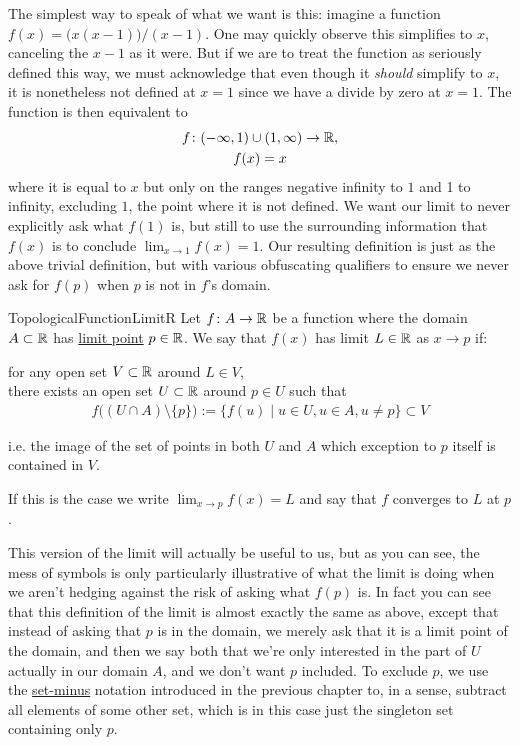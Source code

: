 \documentclass[11pt]{article}
\begin{document}
The simplest way to speak of what we want is this: imagine a function $f(x) = \big(x(x-1)\big)/(x-1)$. One may quickly observe this simplifies to $x$, canceling the $x-1$ as it were. But if we are to treat the function as seriously defined this way, we must acknowledge that even though it \emph{should} simplify to $x$, it is nonetheless not defined at $x=1$ since we have a divide by zero at $x=1$. The function is then equivalent to \begin{gather*}
f\colon (-\infty,1) \cup (1,\infty) \to \mathbb{R}, \\
f(x) = x
\end{gather*}
where it is equal to $x$ but only on the ranges negative infinity to $1$ and 1 to infinity, excluding $1$, the point where it is not defined. We want our limit to never explicitly ask what $f(1)$ is, but still to use the surrounding information that $f(x)$ is  to conclude $\lim_{x \to 1} f(x) = 1$. Our resulting definition is just as the above trivial definition, but with various obfuscating qualifiers to ensure we never ask for $f(p)$ when $p$ is not in $f$'s domain.

\begin{label definition}{TopologicalFunctionLimitR}
Let $f \colon A \to \mathbb{R}$ be a function where the domain $A \subset \mathbb{R}$ has \hyperref[pro:ClosedSetsClosedUnderLimitsR]{limit point} $p \in \mathbb{R}$. We say that $f(x)$ has limit $L \in \mathbb{R}$ as $x \to p$ if:
\begin{center}
for any open set $V \subset \mathbb{R}$ around $L \in V$,\\
there exists an open set $U \subset \mathbb{R}$ around $p \in U$ such that \begin{gather*}
f\big((U \cap A) \setminus \{p\} \big) := \{ f(u) \mid u\in U, u\in A, u \neq p\} \subset V
\end{gather*}
\end{center}
i.e. the image of the set of points in both $U$ and $A$ which exception to $p$ itself is contained in $V$.

If this is the case we write $\lim_{x\to p} f(x) = L$ and say that $f$ converges to $L$ at $p$.
\end{label definition}

This version of the limit will actually be useful to us, but as you can see, the mess of symbols is only particularly illustrative of what the limit is doing when we aren't hedging against the risk of asking what $f(p)$ is. In fact you can see that this definition of the limit is almost exactly the same as above, except that instead of asking that $p$ is in the domain, we merely ask that it is a limit point of the domain, and then we say both that we're only interested in the part of $U$ actually in our domain $A$, and we don't want $p$ included. To exclude $p$, we use the \hyperlink{https://clockssugars.blog/appliuni/prelims/maththink.html\#maththink_4}{set-minus} notation introduced in the previous chapter to, in a sense, subtract all elements of some other set, which is in this case just the singleton set containing only $p$.
\end{document}
